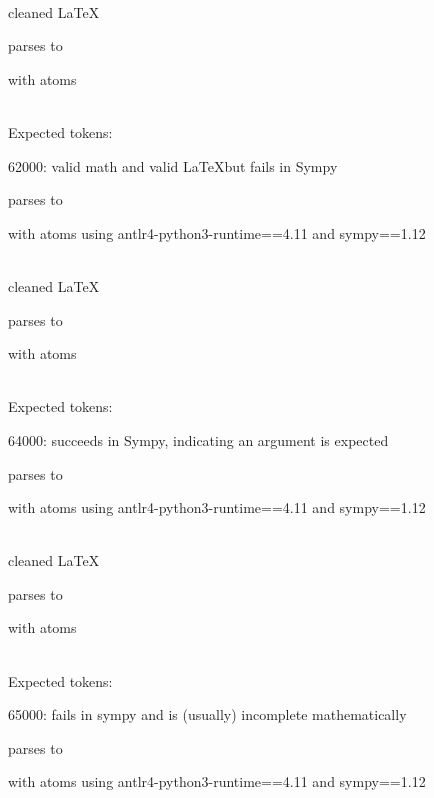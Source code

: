 \documentclass{article}
\begin{document}
\ \\
cleaned \LaTeX

parses to

with atoms


\ \\
Expected tokens:


\hrulefill

62000: 
valid math and valid \LaTeX but fails in Sympy

parses to

with atoms
using antlr4-python3-runtime==4.11 and sympy==1.12

\ \\
cleaned \LaTeX

parses to

with atoms


\ \\
Expected tokens:


\hrulefill


64000: 
succeeds in Sympy, indicating an argument is expected

parses to

with atoms
using antlr4-python3-runtime==4.11 and sympy==1.12

\ \\
cleaned \LaTeX

parses to

with atoms


\ \\
Expected tokens:



\hrulefill

65000: 
fails in sympy and is (usually) incomplete mathematically

parses to

with atoms
using antlr4-python3-runtime==4.11 and sympy==1.12
\end{document}

